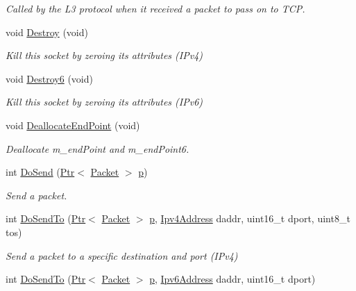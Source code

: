 \begin{DoxyCompactItemize}
\begin{DoxyCompactList}\small\item\em Called by the L3 protocol when it received a packet to pass on to T\+CP. \end{DoxyCompactList}\item 
void \hyperlink{classns3_1_1UdpSocketImpl_ab0f9092f8f28c5d246cae63476215fc8}{Destroy} (void)
\begin{DoxyCompactList}\small\item\em Kill this socket by zeroing its attributes (I\+Pv4) \end{DoxyCompactList}\item 
void \hyperlink{classns3_1_1UdpSocketImpl_a40198099b528e0edbcfa323287c676bd}{Destroy6} (void)
\begin{DoxyCompactList}\small\item\em Kill this socket by zeroing its attributes (I\+Pv6) \end{DoxyCompactList}\item 
void \hyperlink{classns3_1_1UdpSocketImpl_a06e34674acd7ec7f6c186e52767cdf2c}{Deallocate\+End\+Point} (void)
\begin{DoxyCompactList}\small\item\em Deallocate m\+\_\+end\+Point and m\+\_\+end\+Point6. \end{DoxyCompactList}\item 
int \hyperlink{classns3_1_1UdpSocketImpl_aeb7a2f7998edd56c9079ac6a3518cd89}{Do\+Send} (\hyperlink{classns3_1_1Ptr}{Ptr}$<$ \hyperlink{classns3_1_1Packet}{Packet} $>$ \hyperlink{lte__link__budget__x2__handover__measures_8m_ac9de518908a968428863f829398a4e62}{p})
\begin{DoxyCompactList}\small\item\em Send a packet. \end{DoxyCompactList}\item 
int \hyperlink{classns3_1_1UdpSocketImpl_a18b22c398f6e9a7806f92b6a3ca7b3e8}{Do\+Send\+To} (\hyperlink{classns3_1_1Ptr}{Ptr}$<$ \hyperlink{classns3_1_1Packet}{Packet} $>$ \hyperlink{lte__link__budget__x2__handover__measures_8m_ac9de518908a968428863f829398a4e62}{p}, \hyperlink{classns3_1_1Ipv4Address}{Ipv4\+Address} daddr, uint16\+\_\+t dport, uint8\+\_\+t tos)
\begin{DoxyCompactList}\small\item\em Send a packet to a specific destination and port (I\+Pv4) \end{DoxyCompactList}\item 
int \hyperlink{classns3_1_1UdpSocketImpl_a4c3672c1127cbe31678d8d18751d3f4c}{Do\+Send\+To} (\hyperlink{classns3_1_1Ptr}{Ptr}$<$ \hyperlink{classns3_1_1Packet}{Packet} $>$ \hyperlink{lte__link__budget__x2__handover__measures_8m_ac9de518908a968428863f829398a4e62}{p}, \hyperlink{classns3_1_1Ipv6Address}{Ipv6\+Address} daddr, uint16\+\_\+t dport)

\end{DoxyCompactItemize}
